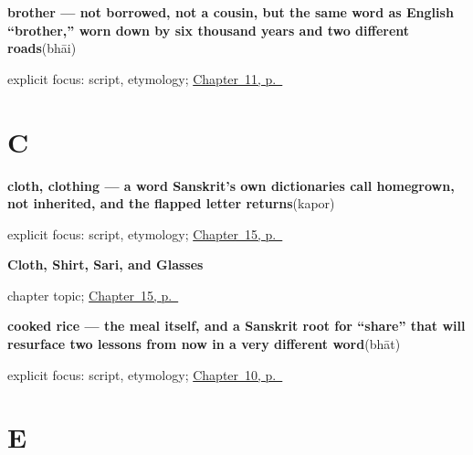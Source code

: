 \noindent\begin{minipage}[t]{\linewidth}
\raggedright
\textbf{brother — not borrowed, not a cousin, but the same word as English \textquotedblleft{}brother,\textquotedblright{} worn down by six thousand years and two different roads}\enspace\emph{}\enspace(bhāi)\par
\footnotesize explicit focus: script, etymology; \hyperref[ch:bn-friend-family-brother-sister]{Chapter~11, p.~\pageref*{ch:bn-friend-family-brother-sister}}
\end{minipage}\par\smallskip

\section*{C}

\noindent\begin{minipage}[t]{\linewidth}
\raggedright
\textbf{cloth, clothing — a word Sanskrit's own dictionaries call homegrown, not inherited, and the flapped letter returns}\enspace\emph{}\enspace(kapor)\par
\footnotesize explicit focus: script, etymology; \hyperref[ch:bn-cloth-shirt-sari-glasses]{Chapter~15, p.~\pageref*{ch:bn-cloth-shirt-sari-glasses}}
\end{minipage}\par\smallskip

\noindent\begin{minipage}[t]{\linewidth}
\raggedright
\textbf{Cloth, Shirt, Sari, and Glasses}\par
\footnotesize chapter topic; \hyperref[ch:bn-cloth-shirt-sari-glasses]{Chapter~15, p.~\pageref*{ch:bn-cloth-shirt-sari-glasses}}
\end{minipage}\par\smallskip

\noindent\begin{minipage}[t]{\linewidth}
\raggedright
\textbf{cooked rice — the meal itself, and a Sanskrit root for \textquotedblleft{}share\textquotedblright{} that will resurface two lessons from now in a very different word}\enspace\emph{}\enspace(bhāt)\par
\footnotesize explicit focus: script, etymology; \hyperref[ch:bn-tea-water-milk-rice]{Chapter~10, p.~\pageref*{ch:bn-tea-water-milk-rice}}
\end{minipage}\par\smallskip

\section*{E}

